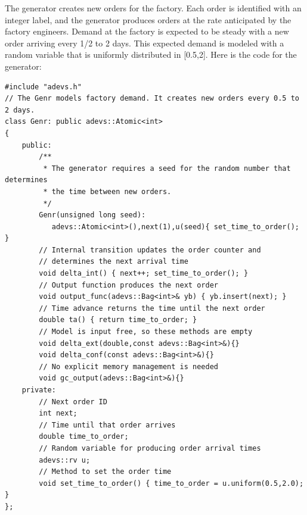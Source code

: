 The generator creates new orders for the factory. Each order is identified with an integer label, and the generator produces orders at the rate anticipated by the factory engineers. Demand at the factory is expected to be steady with a new order arriving every 1/2 to 2 days. This expected demand is modeled with a random variable that is uniformly distributed in [0.5,2]. Here is the code for the generator:
\begin{verbatim}
#include "adevs.h"
// The Genr models factory demand. It creates new orders every 0.5 to 2 days.
class Genr: public adevs::Atomic<int>
{
    public:
        /**
         * The generator requires a seed for the random number that determines
         * the time between new orders.
         */
        Genr(unsigned long seed):
           adevs::Atomic<int>(),next(1),u(seed){ set_time_to_order(); }
        // Internal transition updates the order counter and
		// determines the next arrival time
        void delta_int() { next++; set_time_to_order(); }
        // Output function produces the next order
        void output_func(adevs::Bag<int>& yb) { yb.insert(next); }
        // Time advance returns the time until the next order
        double ta() { return time_to_order; }
        // Model is input free, so these methods are empty
        void delta_ext(double,const adevs::Bag<int>&){}
        void delta_conf(const adevs::Bag<int>&){}
        // No explicit memory management is needed
        void gc_output(adevs::Bag<int>&){}
    private:
        // Next order ID
        int next;
        // Time until that order arrives
        double time_to_order;
        // Random variable for producing order arrival times
        adevs::rv u;
        // Method to set the order time
        void set_time_to_order() { time_to_order = u.uniform(0.5,2.0); }
};
\end{verbatim} 

